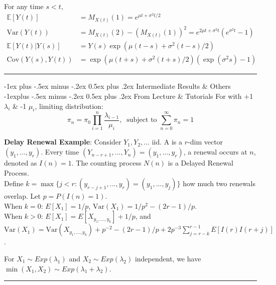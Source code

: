 \documentclass[10pt,landscape,letterpaper]{article}
\makeatletter
\renewcommand{\section}{\@startsection{section}{1}{0mm}%
                                {-1ex plus -.5ex minus -.2ex}%
                                {0.5ex plus .2ex}%
                                {\sffamily\large}}
\renewcommand{\subsection}{\@startsection{subsection}{2}{0mm}%
                                {-1explus -.5ex minus -.2ex}%
                                {0.5ex plus .2ex}%
                                {\sffamily\normalsize\itshape}}
\makeatother
\begin{document}
\begin{multicols}{3}
\smallskip
For any time $s < t$,
\[
\begin{aligned}
\mathbb{E}[Y(t)] &= M_{X(t)}(1) = e^{\mu t + \sigma^2 t/2}
\\
\text{Var}(Y(t)) &= M_{X(t)}(2) - (M_{X(t)}(1))^2 = e^{2\mu t + \sigma^2 t} (e^{\sigma^2 t} - 1)
\\
\mathbb{E}[Y(t) | Y(s)] &= Y(s)\exp(\mu (t-s) + \sigma^2 (t-s)/2)
\\
\text{Cov}(Y(s), Y(t)) &= \exp(\mu (t+s) + \sigma^2(t+s)/2) (\exp(\sigma^2 s)-1)
\end{aligned}
\]





\noindent\rule{8cm}{0.4pt}

\section{Intermediate Results \& Others}
\subsection{From Lecture \& Tutorials}
For  with +1 $\lambda_i$ \& -1 $\mu_i$, limiting distribution:
\[
\pi_n = \pi_0 \prod_{i=1}^{n} \frac{\lambda_{i-1}}{\mu_i}, \ \text{ subject to }
\sum_{n=0}^{\infty} \pi_n = 1
\]

\smallskip

\textbf{Delay Renewal Example}: Consider $Y_1, Y_2, ...$ iid. A  is a $r$-dim vector $(y_1, ..., y_r)$. Every time $(Y_{n-r+1}, ..., Y_n) = (y_1, ..., y_r)$, a renewal occurs at $n$, denoted as $I(n) = 1$.  The counting process $N(n)$ is a Delayed Renewal Process.
\\
Define  $k = \max \{ j< r: (y_{r-j+1}, ..., y_r) = (y_1, ..., y_j) \}$ how much two renewals overlap. Let $p = P(I(n)=1)$. 
\\
When $k = 0$: $E[X_1] = 1/p$,  $\text{Var}(X_1) = 1/p^2 - (2r-1)/p$.
\\
When $k > 0$: $E[X_1] = E[X_{y_1, ..., y_k}] + 1/p$, and $\text{Var}(X_1) = \text{Var}(X_{y_1, ..., y_k}) + p^{-2} - (2r-1)/p + 2p^{-3} \sum_{j=r-k}^{r-1} E[I(r)I(r+j)]$.

\smallskip

 For $X_1 \sim Exp(\lambda_1)$ and $X_2 \sim Exp(\lambda_2)$ independent, we have $\min(X_1, X_2) \sim Exp(\lambda_1 + \lambda_2)$.



\noindent\rule{8cm}{0.4pt}


\end{multicols}
\end{document}
